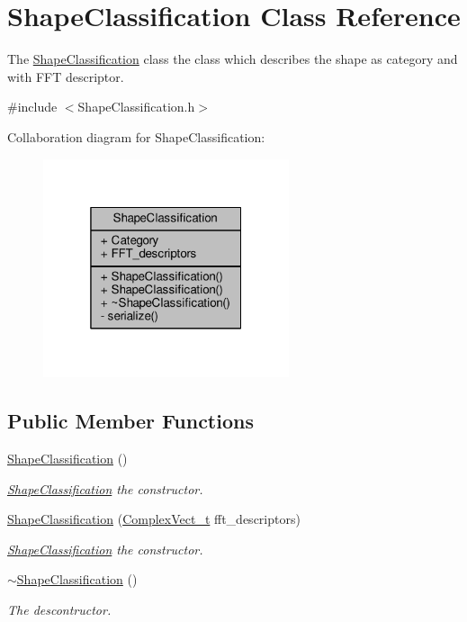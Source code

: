 \hypertarget{class_shape_classification}{}\section{Shape\+Classification Class Reference}
\label{class_shape_classification}


The \hyperlink{class_shape_classification}{Shape\+Classification} class the class which describes the shape as category and with F\+F\+T descriptor.  




{\ttfamily \#include $<$Shape\+Classification.\+h$>$}



Collaboration diagram for Shape\+Classification\+:\nopagebreak
\begin{figure}[H]
\begin{center}
\leavevmode
\includegraphics[width=205pt]{class_shape_classification__coll__graph}
\end{center}
\end{figure}
\subsection*{Public Member Functions}
\begin{DoxyCompactItemize}
\item 
\hyperlink{class_shape_classification_a53cff8a411773e7e36c5afabe3ad5ec3}{Shape\+Classification} ()
\begin{DoxyCompactList}\small\item\em \hyperlink{class_shape_classification}{Shape\+Classification} the constructor. \end{DoxyCompactList}\item 
\hyperlink{class_shape_classification_ac5a2cb1251c3c13c1f445cdb017f3ced}{Shape\+Classification} (\hyperlink{_soil_math_types_8h_a7567e521c2b2c408dcb62dbff72390f7}{Complex\+Vect\+\_\+t} fft\+\_\+descriptors)
\begin{DoxyCompactList}\small\item\em \hyperlink{class_shape_classification}{Shape\+Classification} the constructor. \end{DoxyCompactList}\item 
\hyperlink{class_shape_classification_a9e5cdfa2409f961494ac2e8e444712e6}{$\sim$\+Shape\+Classification} ()
\begin{DoxyCompactList}\small\item\em The descontructor. \end{DoxyCompactList}\end{DoxyCompactItemize}
